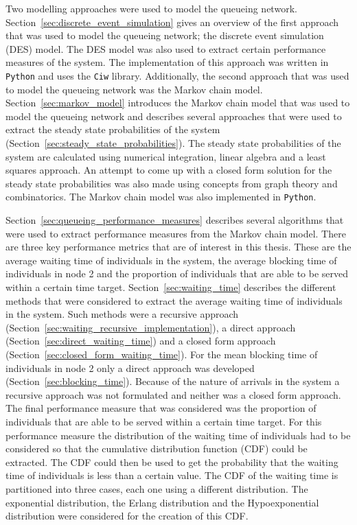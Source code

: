Two modelling approaches were used to model the queueing network.
Section~\ref{sec:discrete_event_simulation} gives an overview of the first
approach that was used to model the queueing network; the discrete event
simulation (DES) model.
The DES model was also used to extract certain performance measures of the
system.
The implementation of this approach was written in \texttt{Python} and uses the
\texttt{Ciw} library.
Additionally, the second approach that was used to model the queueing network
was the Markov chain model.
Section~\ref{sec:markov_model} introduces the Markov chain model that was
used to model the queueing network and describes several approaches that
were used to extract the steady state probabilities of the system
(Section~\ref{sec:steady_state_probabilities}).
The steady state probabilities of the system are calculated using numerical
integration, linear algebra and a least squares approach.
An attempt to come up with a closed form solution for the steady state
probabilities was also made using concepts from graph theory and
combinatorics.
The Markov chain model was also implemented in \texttt{Python}.

Section~\ref{sec:queueing_performance_measures} describes several algorithms
that were used to extract performance measures from the Markov chain model.
There are three key performance metrics that are of interest in this thesis.
These are the average waiting time of individuals in the system, the average
blocking time of individuals in node 2 and the proportion of individuals that
are able to be served within a certain time target.
Section~\ref{sec:waiting_time} describes the different methods that were
considered to extract the average waiting time of individuals in the system.
Such methods were a recursive approach
(Section~\ref{sec:waiting_recursive_implementation}), a direct approach 
(Section~\ref{sec:direct_waiting_time}) and a closed form approach
(Section~\ref{sec:closed_form_waiting_time}).
For the mean blocking time of individuals in node 2 only a direct approach
was developed (Section~\ref{sec:blocking_time}).
Because of the nature of arrivals in the system a recursive approach was not
formulated and neither was a closed form approach.
The final performance measure that was considered was the proportion of
individuals that are able to be served within a certain time target.
For this performance measure the distribution of the waiting time of
individuals had to be considered so that the cumulative distribution
function (CDF) could be extracted.
The CDF could then be used to get the probability that the waiting time of
individuals is less than a certain value.
The CDF of the waiting time is partitioned into three cases, each one using a
different distribution.
The exponential distribution, the Erlang distribution and the Hypoexponential
distribution were considered for the creation of this CDF.


